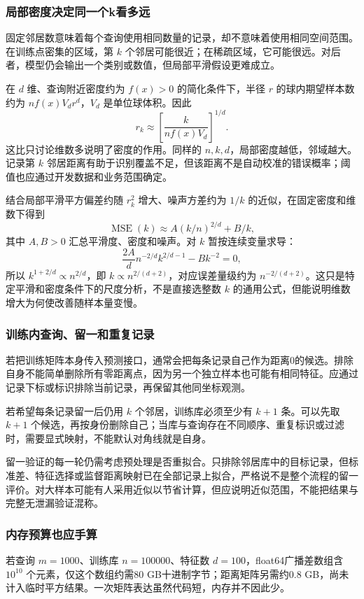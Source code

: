 \documentclass[UTF8,fontset=none,zihao=-4,a4paper]{ctexart}
\numberwithin{equation}{section}
\numberwithin{figure}{section}
\begin{document}
\subsubsection{局部密度决定同一个k看多远}
固定邻居数意味着每个查询使用相同数量的记录，却不意味着使用相同空间范围。在训练点密集的区域，第 $k$ 个邻居可能很近；在稀疏区域，它可能很远。对后者，模型仍会输出一个类别或数值，但局部平滑假设更难成立。

在 $d$ 维、查询附近密度约为 $f(x)>0$ 的简化条件下，半径 $r$ 的球内期望样本数约为 $nf(x)V_dr^d$，$V_d$ 是单位球体积。因此
\[
 r_k\approx\left[\frac{k}{nf(x)V_d}\right]^{1/d}.
\]
这比只讨论维数多说明了密度的作用。同样的 $n,k,d$，局部密度越低，邻域越大。记录第 $k$ 邻居距离有助于识别覆盖不足，但该距离不是自动校准的错误概率；阈值也应通过开发数据和业务范围确定。

结合局部平滑平方偏差约随 $r_k^2$ 增大、噪声方差约为 $1/k$ 的近似，在固定密度和维数下得到
\[
 \operatorname{MSE}(k)\approx A(k/n)^{2/d}+B/k,
\]
其中 $A,B>0$ 汇总平滑度、密度和噪声。对 $k$ 暂按连续变量求导：
\[
 \frac{2A}{d}n^{-2/d}k^{2/d-1}-Bk^{-2}=0,
\]
所以 $k^{1+2/d}\propto n^{2/d}$，即 $k\propto n^{2/(d+2)}$，对应误差量级约为 $n^{-2/(d+2)}$。这只是特定平滑和密度条件下的尺度分析，不是直接选整数 $k$ 的通用公式，但能说明维数增大为何使改善随样本量变慢。

\subsubsection{训练内查询、留一和重复记录}
若把训练矩阵本身传入预测接口，通常会把每条记录自己作为距离0的候选。排除自身不能简单删除所有零距离点，因为另一个独立样本也可能有相同特征。应通过记录下标或标识排除当前记录，再保留其他同坐标观测。

若希望每条记录留一后仍用 $k$ 个邻居，训练库必须至少有 $k+1$ 条。可以先取 $k+1$ 个候选，再按身份删除自己；当库与查询存在不同顺序、重复标识或过滤时，需要显式映射，不能默认对角线就是自身。

留一验证的每一轮仍需考虑预处理是否重拟合。只排除邻居库中的目标记录，但标准差、特征选择或监督距离映射已在全部记录上拟合，严格说不是整个流程的留一评价。对大样本可能有人采用近似以节省计算，但应说明近似范围，不能把结果与完整无泄漏验证混称。

\subsubsection{内存预算也应手算}
若查询 $m=1000$、训练库 $n=100000$、特征数 $d=100$，float64广播差数组含 $10^{10}$ 个元素，仅这个数组约需80 GB十进制字节；距离矩阵另需约0.8 GB，尚未计入临时平方结果。一次矩阵表达虽然代码短，内存并不因此少。
\end{document}
